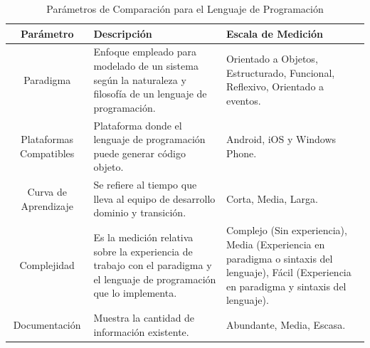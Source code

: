 \begin{table}[h!]
	\begin{center}
		\begin{tabular}{|c|p{4.5cm}|p{4.5cm}|}
			\hline \rowcolor[RGB]{51,153,255} 
			\textcolor{blanco}{\bf Parámetro} &
				\textcolor{blanco}{\bf Descripción} &
				\textcolor{blanco}{\bf Escala de Medición} \\
			\hline 
				Paradigma &
				Enfoque empleado para modelado de un sistema según la naturaleza y filosofía de un lenguaje de programación. &
				Orientado a Objetos, Estructurado, Funcional, Reflexivo, Orientado a eventos. \\
      		\hline \rowcolor[RGB]{240,248,255}
      			Plataformas Compatibles &
				Plataforma donde el lenguaje de programación puede generar código objeto. &
				Android, iOS y Windows Phone. \\
      		\hline 
      			Curva de Aprendizaje &
				Se refiere al tiempo que lleva al equipo de desarrollo dominio y transición. &
				Corta, Media, Larga. \\
      		\hline \rowcolor[RGB]{240,248,255}
      			Complejidad &
				Es la medición relativa sobre la experiencia de trabajo con el paradigma y el lenguaje de programación que lo implementa. &
				Complejo (Sin experiencia), Media (Experiencia en paradigma o sintaxis del lenguaje), Fácil (Experiencia en paradigma y sintaxis del lenguaje). \\
      		\hline 
      			Documentación &
				Muestra la cantidad de información existente. &
				Abundante, Media, Escasa. \\
      		\hline 
    		\end{tabular}
	\end{center}
	\caption[Parámetros de Comparación para el Lenguaje de Programación]{Parámetros de Comparación para el Lenguaje de Programación} 
	\label{tab:paramLengu}
\end{table}

